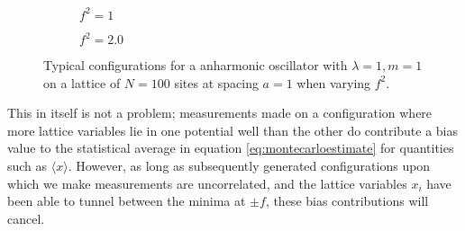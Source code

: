 \documentclass[12pt]{article}
\begin{document}
\begin{figure}
\begin{subfigure}[b]{0.5\textwidth}
                        \caption{$f^2=1$}
                        \label{fig:IsolatedAnharmonicModeF2}
                    \end{subfigure}
                    \begin{subfigure}[b]{0.5\textwidth}
                        \caption{$f^2=2.0$}
                        \label{fig:IsolatedAnharmonicModeF3}
                    \end{subfigure}
                    \caption{Typical configurations for a anharmonic oscillator with $\lambda=1, m=1$ on a lattice of $N=100$ sites at spacing $a = 1$ when varying $f^2$.}
                    \label{fig:IsolatedAnharmonicModes}
                \end{figure} 
    This in itself is not a problem; measurements made on a configuration where more lattice variables lie in one potential well than the other do contribute a bias value to the statistical average in equation \ref{eq:montecarloestimate} for quantities such as $\langle x \rangle$. However, as long as subsequently generated configurations upon which we make measurements are uncorrelated, and the lattice variables $x_i$ have been able to tunnel between the minima at $\pm f$, these bias contributions will cancel.
\end{document}
